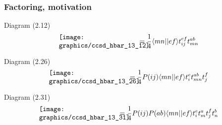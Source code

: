 \begin{frame}
    \frametitle{Factoring, motivation}

\small
\begin{block}{Diagram (2.12)}
    \begin{equation*}
        \parbox{40mm}{\texttt{[image: graphics/ccsd\_hbar\_13\_12]}}
        = \frac{1}{4}  \bra{mn}\ket{ef} t_{ij}^{ef} t_{mn}^{ab}
    \end{equation*}
\end{block}
\begin{block}{Diagram (2.26)}
    \begin{equation*}
        \parbox{40mm}{\texttt{[image: graphics/ccsd\_hbar\_13\_26]}}
        = \frac{1}{4} P(ij) \bra{mn}\ket{ef} t_i^e t_{mn}^{ab} t_j^f
    \end{equation*}
\end{block}
\begin{block}{Diagram (2.31)}
    \begin{equation*}
        \parbox{40mm}{\texttt{[image: graphics/ccsd\_hbar\_13\_31]}}
        = \frac{1}{4} P(ij) P(ab) \bra{mn}\ket{ef} t_i^e t_m^a t_j^f t_n^b
    \end{equation*}
\end{block}
\end{frame}

